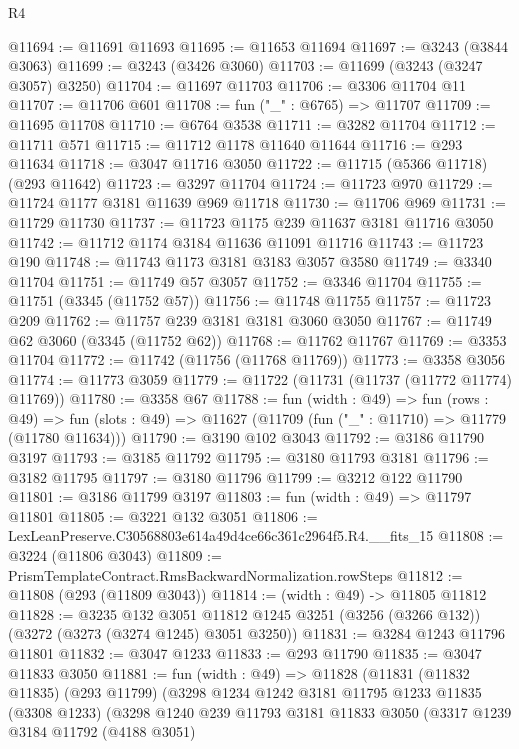 \begin{lexlean}{R4}
\begin{coremodule}
@11694 := @11691 @11693
@11695 := @11653 @11694
@11697 := @3243 (@3844 @3063)
@11699 := @3243 (@3426 @3060)
@11703 := @11699 (@3243 (@3247 @3057) @3250)
@11704 := @11697 @11703
@11706 := @3306 @11704 @11
@11707 := @11706 @601
@11708 := fun ("_" : @6765) => @11707
@11709 := @11695 @11708
@11710 := @6764 @3538
@11711 := @3282 @11704
@11712 := @11711 @571
@11715 := @11712 @1178 @11640 @11644
@11716 := @293 @11634
@11718 := @3047 @11716 @3050
@11722 := @11715 (@5366 @11718) (@293 @11642)
@11723 := @3297 @11704
@11724 := @11723 @970
@11729 := @11724 @1177 @3181 @11639 @969 @11718
@11730 := @11706 @969
@11731 := @11729 @11730
@11737 := @11723 @1175 @239 @11637 @3181 @11716 @3050
@11742 := @11712 @1174 @3184 @11636 @11091 @11716
@11743 := @11723 @190
@11748 := @11743 @1173 @3181 @3183 @3057 @3580
@11749 := @3340 @11704
@11751 := @11749 @57 @3057
@11752 := @3346 @11704
@11755 := @11751 (@3345 (@11752 @57))
@11756 := @11748 @11755
@11757 := @11723 @209
@11762 := @11757 @239 @3181 @3181 @3060 @3050
@11767 := @11749 @62 @3060 (@3345 (@11752 @62))
@11768 := @11762 @11767
@11769 := @3353 @11704
@11772 := @11742 (@11756 (@11768 @11769))
@11773 := @3358 @3056
@11774 := @11773 @3059
@11779 := @11722 (@11731 (@11737 (@11772 @11774) @11769))
@11780 := @3358 @67
@11788 := fun (width : @49) =>
  fun (rows : @49) =>
  fun (slots : @49) => @11627 (@11709 (fun ("_" : @11710) => @11779 (@11780 @11634)))
@11790 := @3190 @102 @3043
@11792 := @3186 @11790 @3197
@11793 := @3185 @11792
@11795 := @3180 @11793 @3181
@11796 := @3182 @11795
@11797 := @3180 @11796
@11799 := @3212 @122 @11790
@11801 := @3186 @11799 @3197
@11803 := fun (width : @49) => @11797 @11801
@11805 := @3221 @132 @3051
@11806 := LexLeanPreserve.C30568803e614a49d4ce66c361c2964f5.R4.__fits_15
@11808 := @3224 (@11806 @3043)
@11809 := PrismTemplateContract.RmsBackwardNormalization.rowSteps
@11812 := @11808 (@293 (@11809 @3043))
@11814 := (width : @49) -> @11805 @11812
@11828 := @3235
    @132
    @3051
    @11812
    @1245
    @3251
    (@3256 (@3266 @132))
    (@3272 (@3273 (@3274 @1245) @3051 @3250))
@11831 := @3284 @1243 @11796 @11801
@11832 := @3047 @1233
@11833 := @293 @11790
@11835 := @3047 @11833 @3050
@11881 := fun (width : @49) =>
  @11828
    (@11831
      (@11832 @11835)
      (@293 @11799)
      (@3298
        @1234
        @1242
        @3181
        @11795
        @1233
        @11835
        (@3308 @1233)
        (@3298
          @1240
          @239
          @11793
          @3181
          @11833
          @3050
          (@3317
            @1239
            @3184
            @11792
            (@4188 @3051)

\end{coremodule}
\end{lexlean}
